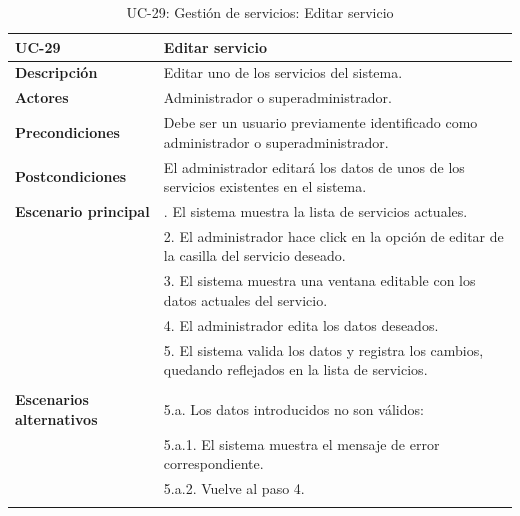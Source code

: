 \begin{table}
  \begin{center}
    \begin{tabularx}{16.4cm}{|l|X|}
      \hline
      \textbf{UC-29} & \textbf{Editar servicio}\\
      \hline
      \textbf{Descripción} & Editar uno de los servicios del sistema.\\
      \hline
      \textbf{Actores} & Administrador o superadministrador.\\
      \hline
      \textbf{Precondiciones} & Debe ser un usuario previamente identificado como administrador o superadministrador.\\
      \hline
      \textbf{Postcondiciones} & El administrador editará los datos de unos de los servicios existentes en el sistema.\\
      \hline
      \textbf{Escenario principal} & \smallskip 1. El sistema muestra la lista de servicios actuales.\\
      & 2. El administrador hace click en la opción de editar de la casilla del servicio deseado.\\
      & 3. El sistema muestra una ventana editable con los datos actuales del servicio.\\
      & 4. El administrador edita los datos deseados.\\
      & 5. El sistema valida los datos y registra los cambios, quedando reflejados en la lista de servicios.\\
      & \\
      \hline
      \textbf{Escenarios alternativos} & \smallskip 5.a. Los datos introducidos no son válidos:\\
      & \hspace{0.3cm} 5.a.1. El sistema muestra el mensaje de error correspondiente.\\
      & \hspace{0.3cm} 5.a.2. Vuelve al paso 4.\\
      & \\
      \hline
    \end{tabularx}
    \caption{UC-29: Gestión de servicios: Editar servicio}
    \label{tab:CU-editar-servicio}
  \end{center}
\end{table}


